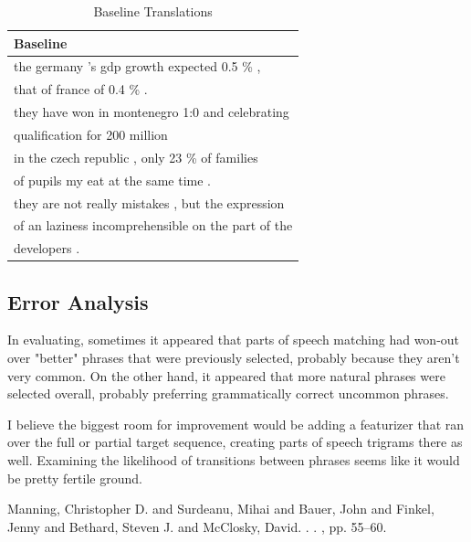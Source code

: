 \documentclass[11pt]{article}
\begin{document}
\begin{table}
  \begin{center}
    \begin{tabular}{ l }
      \hline
        \textbf{Baseline} \\
      \hline
        the germany 's gdp growth expected 0.5 \% ,\\
        that of france of 0.4 \% .\\
      \hline
        they have won in montenegro 1:0 and celebrating\\
        qualification for 200 million\\
      \hline
        in the czech republic , only 23 \% of families\\
        of pupils my eat at the same time .\\
      \hline
        they are not really mistakes , but the expression\\
        of an laziness incomprehensible on the part of the\\
        developers .\\
      \hline
    \end{tabular}
  \end{center}
  \caption{Baseline Translations}
\end{table}

\subsection{Error Analysis}

In evaluating, sometimes it appeared that parts of speech matching had won-out
over "better" phrases that were previously selected, probably because they
aren't very common.  On the other hand, it appeared that more natural phrases
were selected overall, probably preferring grammatically correct uncommon phrases.

I believe the biggest room for improvement would be adding a featurizer that ran
over the full or partial target sequence, creating parts of speech trigrams there
as well.  Examining the likelihood of transitions between phrases seems like it would
be pretty fertile ground.

%
%

\begin{thebibliography}{}

Manning, Christopher D. and  Surdeanu, Mihai  and  Bauer, John  and  Finkel, Jenny  and  Bethard, Steven J. and  McClosky, David.
.
.
,
\newblock pp. 55--60.

\end{thebibliography}
\end{document}
